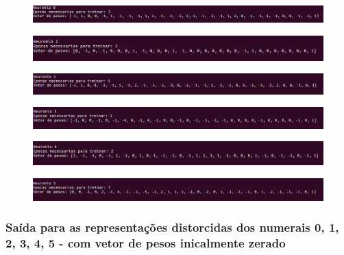 \documentclass[hidelinks,12pt]{article}
\begin{document}
		\begin{figure}[!h]
			\centering
			\includegraphics[scale=0.4]{Figures/E3PE0.png}
		\end{figure}
		
		\begin{figure}[!h]
			\centering
			\includegraphics[scale=0.4]{Figures/E3PE1.png}
		\end{figure}
		
		\begin{figure}[!h]
			\centering
			\includegraphics[scale=0.4]{Figures/E3PE2.png}
		\end{figure}
		
		\begin{figure}[!h]
			\centering
			\includegraphics[scale=0.4]{Figures/E3PE3.png}
		\end{figure}
		
		\begin{figure}[!h]
			\centering
			\includegraphics[scale=0.4]{Figures/E3PE4.png}
		\end{figure}
		
		\begin{figure}[!h]
			\centering
			\includegraphics[scale=0.4]{Figures/E3PE5.png}
		\end{figure}
			
		\newpage
		
		\subsubsection{Saída para as representações distorcidas dos numerais 0, 1, 2, 3, 4, 5 - com vetor de pesos inicalmente zerado}
		
\end{document}
